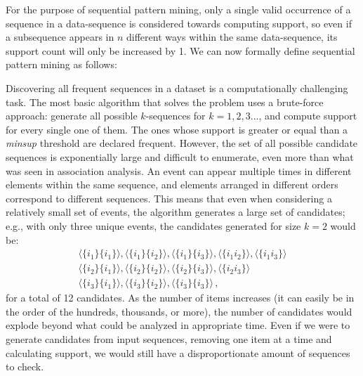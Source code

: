 
For the purpose of sequential pattern mining, only a single valid occurrence of a sequence in a data-sequence is considered towards computing support, so even if a subsequence appears in $n$ different ways within the same data-sequence, its support count will only be increased by 1. We can now formally define sequential pattern mining as follows:

Discovering all frequent sequences in a dataset is a computationally challenging task. The most basic algorithm that solves the problem uses a brute-force approach: generate all possible $k$-sequences for $k = 1,2,3 \ldots$, and compute support for every single one of them. The ones whose support is greater or equal than a \textit{minsup} threshold are declared frequent. However, the set of all possible candidate sequences is exponentially large and difficult to enumerate, even more than what was seen in association analysis. An event can appear multiple times in different elements within the same sequence, and elements arranged in different orders correspond to different sequences. This means that even when considering a relatively small set of events, the algorithm generates a large set of candidates; e.g., with only three unique events, the candidates generated for size $k = 2$ would be:
\begin{gather*}
    \langle\{i_1\} \{i_1\}\rangle, \langle\{i_1\} \{i_2\}\rangle, \langle\{i_1\} \{i_3\}\rangle, \langle\{i_1 i_2\}\rangle, \langle\{i_1 i_3\}\rangle \\ 
    \langle\{i_2\} \{i_1\}\rangle, \langle\{i_2\} \{i_2\}\rangle, \langle\{i_2\} \{i_3\}\rangle, \langle\{i_2 i_3\}\rangle \\
    \langle\{i_3\} \{i_1\}\rangle, \langle\{i_3\} \{i_2\}\rangle, \langle\{i_3\} \{i_3\}\rangle \,,
\end{gather*}
for a total of 12 candidates. As the number of items increases (it can easily be in the order of the hundreds, thousands, or more), the number of candidates would explode beyond what could be analyzed in appropriate time. Even if we were to generate candidates from input sequences, removing one item at a time and calculating support, we would still have a disproportionate amount of sequences to check.

